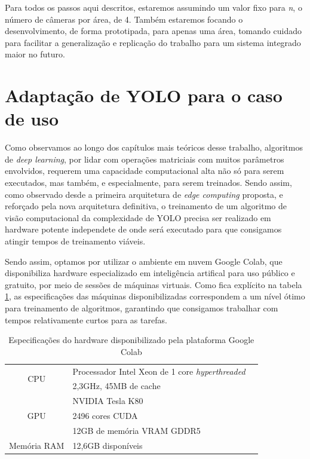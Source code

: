 \documentclass[]{politex}
\begin{document}
Para todos os passos aqui descritos, estaremos assumindo um valor fixo para \textit{n}, o número de câmeras por área, de 4. Também estaremos focando o desenvolvimento, de forma prototipada, para apenas uma área, tomando cuidado para facilitar a generalização e replicação do trabalho para um sistema integrado maior no futuro.

\section{Adaptação de YOLO para o caso de uso}

Como observamos ao longo dos capítulos mais teóricos desse trabalho, algoritmos de \textit{deep learning}, por lidar com operações matriciais com muitos parâmetros envolvidos, requerem uma capacidade computacional alta não só para serem executados, mas também, e especialmente, para serem treinados. Sendo assim, como observado desde a primeira arquitetura de \textit{edge computing} proposta, e reforçado pela nova arquitetura definitiva, o treinamento de um algoritmo de visão computacional da complexidade de YOLO precisa ser realizado em hardware potente independete de onde será executado para que consigamos atingir tempos de treinamento viáveis.

Sendo assim, optamos por utilizar o ambiente em nuvem Google Colab\cite{colabblog}, que disponibiliza hardware especializado em inteligência artifical para uso público e gratuito, por meio de sessões de máquinas virtuais. Como fica explícito na tabela \ref{tbl:googlecolab}, as especificações das máquinas disponibilizadas correspondem a um nível ótimo para treinamento de algoritmos, garantindo que consigamos trabalhar com tempos relativamente curtos para as tarefas.


\begin{table}[]
\centering
\begin{tabular}{|c|l|l|l|l}
\cline{1-4}
\multirow{2}{*}{CPU} & \multicolumn{3}{l|}{Processador Intel Xeon de 1 core \textit{hyperthreaded}} &  \\ \cline{2-4}
                     & \multicolumn{3}{l|}{2,3GHz, 45MB de cache}                          &  \\ \cline{1-4}
\multirow{3}{*}{GPU} & \multicolumn{3}{l|}{NVIDIA Tesla K80}                               &  \\ \cline{2-4}
                     & \multicolumn{3}{l|}{2496 cores CUDA}                                &  \\ \cline{2-4}
                     & \multicolumn{3}{l|}{12GB de memória VRAM GDDR5}                     &  \\ \cline{1-4}
Memória RAM          & \multicolumn{3}{l|}{12,6GB disponíveis}                             &  \\ \cline{1-4}
\end{tabular}
\caption{Especificações do hardware disponibilizado pela plataforma Google Colab}
  \label{tbl:googlecolab}
\end{table}
\end{document}
